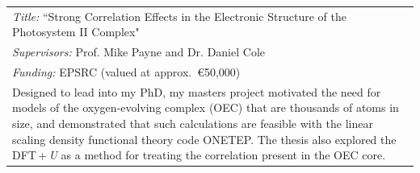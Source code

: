 \documentclass[10pt,a4paper,final]{article}
\begin{document}
\begin{tabularx}{\textwidth}{X}
   \textit{Title:} ``Strong Correlation Effects in the Electronic Structure of the Photosystem II Complex"
   \\
   \rowcolor{seaborn_bg_grey}%

   \textit{Supervisors:} Prof. Mike Payne and Dr. Daniel Cole
   \\
   \rowcolor{seaborn_bg_grey}%

   \textit{Funding:} EPSRC (valued at approx.\ \euro{}50,000)
   \\
   \rowcolor{seaborn_bg_grey}

   Designed to lead into my PhD, my masters project motivated the need for models of the oxygen-evolving complex (OEC) that are thousands of atoms in size, and demonstrated that such calculations are feasible with the linear scaling density functional theory code ONETEP. The thesis also explored the DFT\,+\,\emph{U} as a method for treating the correlation present in the OEC core.
   \\
   \end{tabularx}
   \newpage
\end{document}
